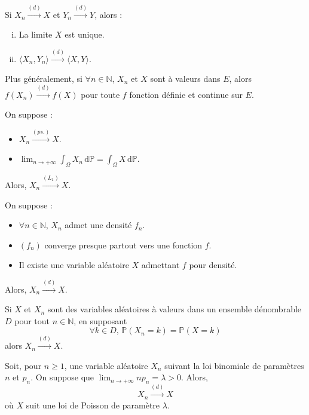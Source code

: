 
	\begin{proposition}
		Si $X_n \overset{(d)}{\longrightarrow} X$ et $Y_n \overset{(d)}{\longrightarrow} Y$, alors :
		\begin{enumerate}[(i)]
			\item La limite $X$ est unique.
			\item $\langle X_n, Y_n \rangle \overset{(d)}{\longrightarrow} \langle X, Y \rangle$.
		\end{enumerate}
		Plus généralement, si $\forall n \in \mathbb{N}$, $X_n$ et $X$ sont à valeurs dans $E$, alors $f(X_n) \overset{(d)}{\longrightarrow} f(X)$ pour toute $f$ fonction définie et continue sur $E$.
	\end{proposition}

	\begin{theorem}
		On suppose :
		\begin{itemize}
			\item $X_n \overset{(ps.)}{\longrightarrow} X$.
			\item $\lim_{n \rightarrow +\infty} \int_\Omega X_n \, \mathrm{d}\mathbb{P} = \int_\Omega X \, \mathrm{d}\mathbb{P}$.
		\end{itemize}
		Alors, $X_n \overset{(L_1)}{\longrightarrow} X$.
	\end{theorem}

	\begin{corollary}
		On suppose :
		\begin{itemize}
			\item $\forall n \in \mathbb{N}$, $X_n$ admet une densité $f_n$.
			\item $(f_n)$ converge presque partout vers une fonction $f$.
			\item Il existe une variable aléatoire $X$ admettant $f$ pour densité.
		\end{itemize}
		Alors, $X_n \overset{(d)}{\longrightarrow} X$.
	\end{corollary}

	\begin{corollary}
		Si $X$ et $X_n$ sont des variables aléatoires à valeurs dans un ensemble dénombrable $D$ pour tout $n \in \mathbb{N}$, en supposant
		\[ \forall k \in D, \, \mathbb{P}(X_n = k) = \mathbb{P}(X = k) \]
		alors $X_n \overset{(d)}{\longrightarrow} X$.
	\end{corollary}

	\begin{application}
		Soit, pour $n \geq 1$, une variable aléatoire $X_n$ suivant la loi binomiale de paramètres $n$ et $p_n$. On suppose que $\lim_{n \rightarrow +\infty} n p_n = \lambda > 0$.
		Alors,
		\[ X_n \overset{(d)}{\longrightarrow} X \]
		où $X$ suit une loi de Poisson de paramètre $\lambda$.
	\end{application}

